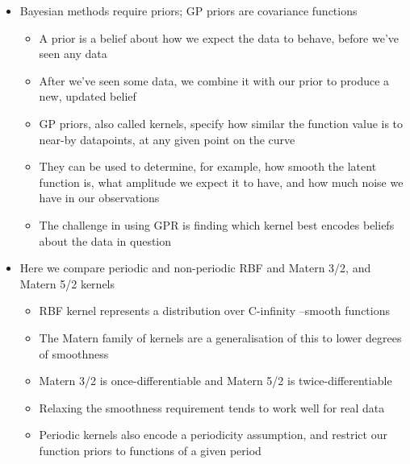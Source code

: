 \documentclass[11pt]{article}
\begin{document}
\begin{itemize}
\item Bayesian methods require priors; GP priors are covariance functions
\begin{itemize}
\item A prior is a belief about how we expect the data to behave, before we've seen any data
\item After we've seen some data, we combine it with our prior to produce a new, updated belief
\item GP priors, also called kernels, specify how similar the function value is to near-by datapoints, at any given point on the curve
\item They can be used to determine, for example, how smooth the latent function is, what amplitude we expect it to have, and how much noise we have in our observations
\item The challenge in using GPR is finding which kernel best encodes beliefs about the data in question
\end{itemize}

\item Here we compare periodic and non-periodic RBF and Matern 3/2, and Matern 5/2 kernels
\begin{itemize}
\item RBF kernel represents a distribution over C-infinity --smooth functions
\item The Matern family of kernels are a generalisation of this to lower degrees of smoothness
\item Matern 3/2 is once-differentiable and Matern 5/2 is twice-differentiable
\item Relaxing the smoothness requirement tends to work well for real data
\item Periodic kernels also encode a periodicity assumption, and restrict our function priors to functions of a given period
\end{itemize}
\end{itemize}
\end{document}
